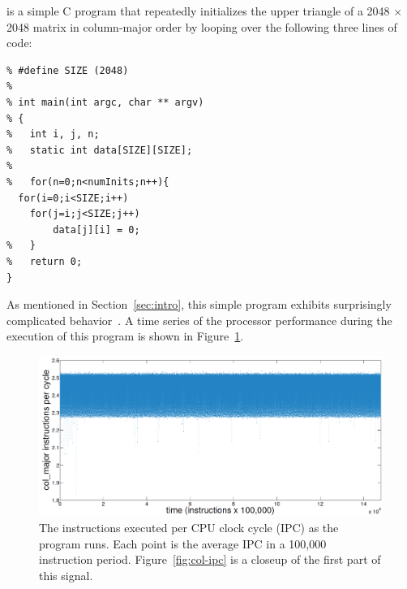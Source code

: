 


\col is a simple C program that repeatedly initializes the upper
triangle of a 2048 $\times$ 2048 matrix in column-major order by
looping over the following three lines of code:
\begin{lstlisting}
% #define SIZE (2048)
% 
% int main(int argc, char ** argv)
% {
%   int i, j, n;
%   static int data[SIZE][SIZE];
%   
%   for(n=0;n<numInits;n++){  
  for(i=0;i<SIZE;i++)
  	for(j=i;j<SIZE;j++)
  		data[j][i] = 0;
%   }
%   return 0;
}
\end{lstlisting}
\noindent As mentioned in Section~\ref{sec:intro}, this simple program
exhibits surprisingly complicated behavior~\cite{mytkowicz09}.  A time
series of the processor performance during the execution of this
program is shown in Figure~\ref{fig:col-ts}.
\begin{figure}[htbp]
  \centering
    \includegraphics[width=\columnwidth]{figs/colFullTS}
    \caption{The instructions executed per CPU clock cycle (IPC) as
      the \col program runs.  Each point is the average IPC in a
      100,000 instruction period. Figure~\ref{fig:col-ipc} is a
      closeup of the first part of this signal.  }
    \label{fig:col-ts}
  
  \end{figure}

